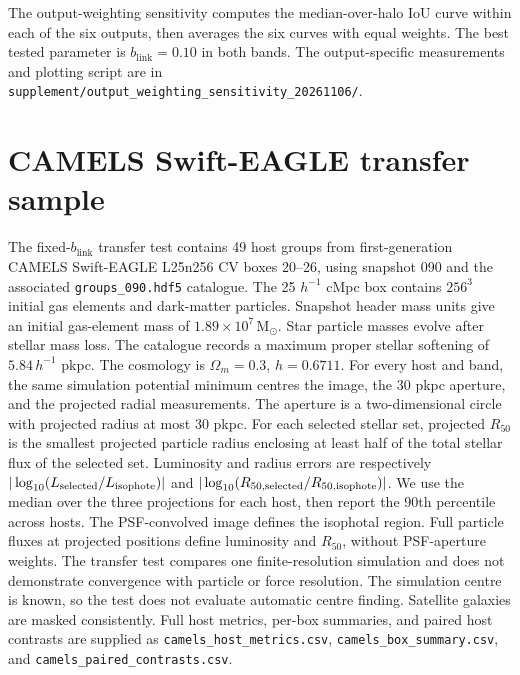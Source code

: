 \documentclass[usenatbib]{mnras}
\begin{document}
The output-weighting sensitivity computes the median-over-halo IoU curve
within each of the six outputs, then averages the six curves with equal
weights. The best tested parameter is $b_{\mathrm{link}}=0.10$ in both
bands. The output-specific measurements and plotting script are in
\texttt{supplement/output\_weighting\_sensitivity\_20261106/}.

\section{CAMELS Swift-EAGLE transfer sample}
The fixed-$b_{\mathrm{link}}$ transfer test contains 49 host groups from first-generation
CAMELS Swift-EAGLE L25n256 CV boxes 20--26, using snapshot 090 and the
associated \texttt{groups\_090.hdf5} catalogue. The 25 $h^{-1}$ cMpc box
contains $256^3$ initial gas elements and dark-matter particles. Snapshot
header mass units give an initial gas-element mass of
$1.89\times10^7\,\mathrm{M}_{\odot}$. Star particle masses evolve after stellar
mass loss. The catalogue records a maximum proper stellar softening of
$5.84\,h^{-1}$ pkpc. The cosmology is $\Omega_m=0.3$, $h=0.6711$.
For every host and band, the same simulation potential minimum centres
the image, the 30 pkpc aperture, and the projected radial measurements.
The aperture is a two-dimensional circle with projected radius at most
30 pkpc. For each selected stellar set, projected $R_{50}$ is the
smallest projected particle radius enclosing at least half of the total
stellar flux of the selected set. Luminosity and radius errors are respectively
$|\log_{10}(L_{\rm selected}/L_{\rm isophote})|$ and
$|\log_{10}(R_{50,\rm selected}/R_{50,\rm isophote})|$. We use the
median over the three projections for each host, then report the
90th percentile across hosts. The PSF-convolved image defines the
isophotal region. Full particle fluxes at projected positions define
luminosity and $R_{50}$, without PSF-aperture weights. The transfer test
compares one finite-resolution simulation and does not demonstrate
convergence with particle or force resolution.
The simulation centre is known, so the test does not evaluate automatic
centre finding. Satellite galaxies are masked consistently. Full host
metrics, per-box summaries, and paired host contrasts are supplied as
\texttt{camels\_host\_metrics.csv}, \texttt{camels\_box\_summary.csv},
and \texttt{camels\_paired\_contrasts.csv}.
\end{document}
